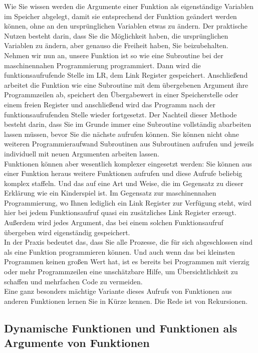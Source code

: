 Wie Sie wissen werden die Argumente einer Funktion als eigenständige Variablen im Speicher abgelegt, damit sie entsprechend der Funktion geändert werden können, ohne an den ursprünglichen Variablen etwas zu ändern. Der praktische Nutzen besteht darin, dass Sie die Möglichkeit haben, die ursprünglichen Variablen zu ändern, aber genauso die Freiheit haben, Sie beizubehalten.\\

Nehmen wir nun an, unsere Funktion ist so wie eine Subroutine bei der maschinennahen Programmierung programmiert. Dann wird die funktionsaufrufende Stelle im LR, dem Link Register gespeichert. Anschließend arbeitet die Funktion wie eine Subroutine mit dem übergebenen Argument ihre Programmzeilen ab, speichert den Übergabewert in einer Speicherstelle oder einem freien Register und anschließend wird das Programm nach der funktionsaufrufenden Stelle wieder fortgesetzt. Der Nachteil dieser Methode besteht darin, dass Sie im Grunde immer eine Subroutine vollständig abarbeiten lassen müssen, bevor Sie die nächste aufrufen können. Sie können nicht ohne weiteren Programmieraufwand Subroutinen aus Subroutinen aufrufen und jeweils individuell mit neuen Argumenten arbeiten lassen.\\

Funktionen können aber wesentlich komplexer eingesetzt werden: Sie können aus einer Funktion heraus weitere Funktionen aufrufen und diese Aufrufe beliebig komplex staffeln. Und das auf eine Art und Weise, die im Gegensatz zu dieser Erklärung wie ein Kinderspiel ist. Im Gegensatz zur maschinennahen Programmierung, wo Ihnen lediglich ein Link Register zur Verfügung steht, wird hier bei jedem Funktionsaufruf quasi ein zusätzliches Link Register erzeugt. Außerdem wird jedes Argument, das bei einem solchen Funktionsaufruf übergeben wird eigenständig gespeichert.\\

In der Praxis bedeutet das, dass Sie alle Prozesse, die für sich abgeschlossen sind als eine Funktion programmieren können. Und auch wenn das bei kleinsten Programmen keinen großen Wert hat, ist es bereits bei Programmen mit vierzig oder mehr Programmzeilen eine unschätzbare Hilfe, um Übersichtlichkeit zu schaffen und mehrfachen Code zu vermeiden.\\

Eine ganz besonders mächtige Variante dieses Aufrufs von Funktionen aus anderen Funktionen lernen Sie in Kürze kennen. Die Rede ist von Rekursionen.

\subsection{Dynamische Funktionen und Funktionen als Argumente von Funktionen}

